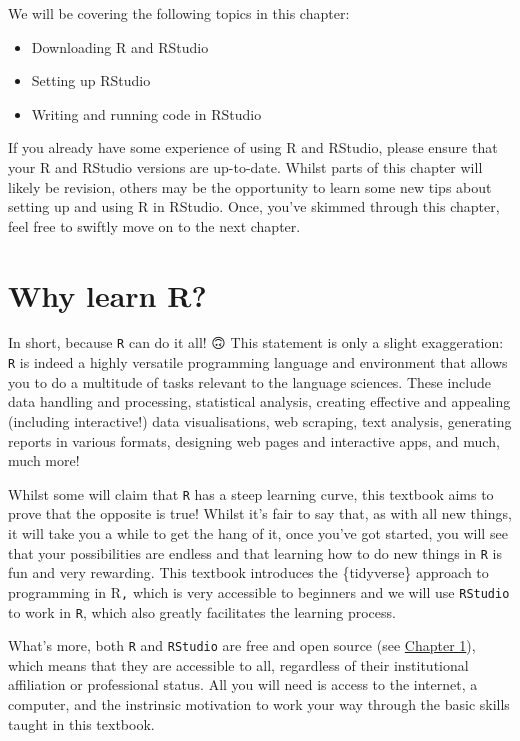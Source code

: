 \documentclass[
  letterpaper,
  DIV=11,
  numbers=noendperiod]{scrreprt}
\providecommand{\tightlist}{%
  \setlength{\itemsep}{0pt}\setlength{\parskip}{0pt}}\usepackage{longtable,booktabs,array}
\begin{document}
We will be covering the following topics in this chapter:

\begin{itemize}
\tightlist
\item
  Downloading R and RStudio
\item
  Setting up RStudio
\item
  Writing and running code in RStudio
\end{itemize}

If you already have some experience of using R and RStudio, please
ensure that your R and RStudio versions are up-to-date. Whilst parts of
this chapter will likely be revision, others may be the opportunity to
learn some new tips about setting up and using R in RStudio. Once,
you've skimmed through this chapter, feel free to swiftly move on to the
next chapter.

\section{Why learn R?}\label{why-learn-r}

In short, because \texttt{R} can do it all! 🙃 This statement is only a
slight exaggeration: \texttt{R} is indeed a highly versatile programming
language and environment that allows you to do a multitude of tasks
relevant to the language sciences. These include data handling and
processing, statistical analysis, creating effective and appealing
(including interactive!) data visualisations, web scraping, text
analysis, generating reports in various formats, designing web pages and
interactive apps, and much, much more! 💪

Whilst some will claim that \texttt{R} has a steep learning curve, this
textbook aims to prove that the opposite is true! Whilst it's fair to
say that, as with all new things, it will take you a while to get the
hang of it, once you've got started, you will see that your
possibilities are endless and that learning how to do new things in
\texttt{R} is fun and very rewarding. This textbook introduces the
\{tidyverse\} approach to programming in R\texttt{,} which is very
accessible to beginners and we will use \texttt{RStudio} to work in
\texttt{R}, which also greatly facilitates the learning process.

What's more, both \texttt{R} and \texttt{RStudio} are free and open
source (see
\href{https://elenlefoll.github.io/RstatsTextbook/OpenScholarship.html}{Chapter
1}), which means that they are accessible to all, regardless of their
institutional affiliation or professional status. All you will need is
access to the internet, a computer, and the instrinsic motivation to
work your way through the basic skills taught in this textbook.
\end{document}
